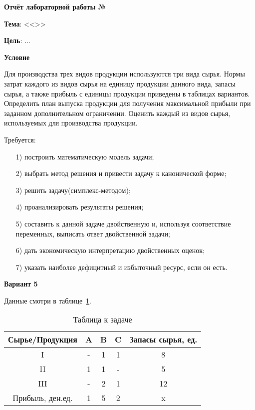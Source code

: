 \begin{center}
  \textbf{Отчёт лабораторной работы №\envReportLabNumber}
\end{center}

\textbf{Тема}:
<<\envReportTitle>>

\textbf{Цель}: ...


\begin{center}
  \textbf{Условие}
\end{center}

Для производства трех видов продукции используются три вида сырья.
Нормы затрат каждого из видов сырья на единицу продукции данного вида, запасы сырья,
а также прибыль с единицы продукции приведены в таблицах вариантов.
Определить план выпуска продукции для получения максимальной прибыли при заданном дополнительном ограничении.
Оценить каждый из видов сырья, используемых для производства продукции.

Требуется:

\begin{enumerate}
  \item[1)] построить математическую модель задачи;
  \item[2)] выбрать метод решения и привести задачу к канонической форме;
  \item[3)] решить задачу(симплекс-методом);
  \item[4)] проанализировать результаты решения;
  \item[5)] составить к данной задаче двойственную и, используя соответствие перемен­ных, выписать ответ двойственной задачи;
  \item[6)] дать экономическую интерпретацию двойственных оценок;
  \item[7)] указать наиболее дефицитный и избыточный ресурс, если он есть.
\end{enumerate}

\begin{center}
  \textbf{Вариант 5}
\end{center}

Данные смотри в таблице~\ref{tab:1}.

\begin{table}[h!]

  \centering

  \caption{Таблица к задаче}
  \label{tab:1}

  \begin{tabular}{|c||c|c|c||c|} 
    \hline
    Сырье/Продукция &A  &B  &C  &Запасы сырья, ед. \\ \hline
    \hline
    I               &-  &1  &1  &8  \\  \hline
    II              &1  &1  &-  &5  \\  \hline
    III             &-  &2  &1  &12 \\  \hline
    \hline
    Прибыль, ден.ед.&1  &5  &2  &x  \\  \hline
  \end{tabular}
\end{table}

